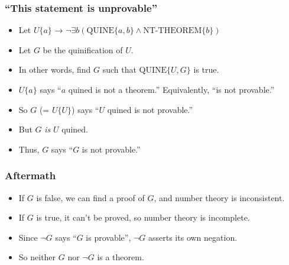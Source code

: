 \documentclass[mathserif]{beamer}
\begin{document}
\begin{frame}
\frametitle{``This statement is unprovable''}
\label{sec-5-3}
\begin{itemize}

\item Let $U\{a\}$ → $¬∃b (\text{QUINE}\{a,b\} ∧ \text{NT-THEOREM}\{b\})$\\
\label{sec-5-3-1}%
\item Let $G$ be the quinification of $U$.\\
\label{sec-5-3-2}%
\item In other words, find $G$ such that $\text{QUINE}\{U,G\}$ is true.\\
\label{sec-5-3-3}%
\item $U\{a\}$ says ``$a$ quined is not a theorem.'' Equivalently, ``is not provable.''\\
\label{sec-5-3-4}%
\item So $G$ (= $U\{U\}$) says ``$U$ quined is not provable.''\\
\label{sec-5-3-5}%
\item But $G$ \emph{is} $U$ quined.\\
\label{sec-5-3-6}%
\item Thus, $G$ says ``$G$ is not provable.''\\
\label{sec-5-3-7}%
\end{itemize} %
\end{frame}
\begin{frame}
\frametitle{Aftermath}
\label{sec-5-4}
\begin{itemize}

\item If $G$ is false, we can find a proof of $G$, and number theory is inconsistent.\\
\label{sec-5-4-1}%
\item If $G$ is true, it can't be proved, so number theory is incomplete.\\
\label{sec-5-4-2}%
\item Since $¬G$ says ``$G$ is provable'', $¬G$ asserts its own negation.\\
\label{sec-5-4-3}%
\item So neither $G$ nor $¬G$ is a theorem.\\
\label{sec-5-4-4}%
\end{itemize} %
\end{frame}
\end{document}
